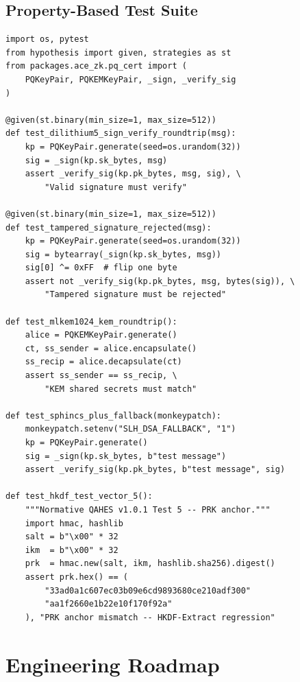 \documentclass[12pt,letterpaper]{article}
\theoremstyle{plain}
\theoremstyle{definition}
\begin{document}
\subsection{Property-Based Test Suite}

\begin{lstlisting}[caption={Hypothesis property tests for PQC roundtrips}]
import os, pytest
from hypothesis import given, strategies as st
from packages.ace_zk.pq_cert import (
    PQKeyPair, PQKEMKeyPair, _sign, _verify_sig
)

@given(st.binary(min_size=1, max_size=512))
def test_dilithium5_sign_verify_roundtrip(msg):
    kp = PQKeyPair.generate(seed=os.urandom(32))
    sig = _sign(kp.sk_bytes, msg)
    assert _verify_sig(kp.pk_bytes, msg, sig), \
        "Valid signature must verify"

@given(st.binary(min_size=1, max_size=512))
def test_tampered_signature_rejected(msg):
    kp = PQKeyPair.generate(seed=os.urandom(32))
    sig = bytearray(_sign(kp.sk_bytes, msg))
    sig[0] ^= 0xFF  # flip one byte
    assert not _verify_sig(kp.pk_bytes, msg, bytes(sig)), \
        "Tampered signature must be rejected"

def test_mlkem1024_kem_roundtrip():
    alice = PQKEMKeyPair.generate()
    ct, ss_sender = alice.encapsulate()
    ss_recip = alice.decapsulate(ct)
    assert ss_sender == ss_recip, \
        "KEM shared secrets must match"

def test_sphincs_plus_fallback(monkeypatch):
    monkeypatch.setenv("SLH_DSA_FALLBACK", "1")
    kp = PQKeyPair.generate()
    sig = _sign(kp.sk_bytes, b"test message")
    assert _verify_sig(kp.pk_bytes, b"test message", sig)

def test_hkdf_test_vector_5():
    """Normative QAHES v1.0.1 Test 5 -- PRK anchor."""
    import hmac, hashlib
    salt = b"\x00" * 32
    ikm  = b"\x00" * 32
    prk  = hmac.new(salt, ikm, hashlib.sha256).digest()
    assert prk.hex() == (
        "33ad0a1c607ec03b09e6cd9893680ce210adf300"
        "aa1f2660e1b22e10f170f92a"
    ), "PRK anchor mismatch -- HKDF-Extract regression"
\end{lstlisting}

\section{Engineering Roadmap}
\label{sec:roadmap}
\end{document}

